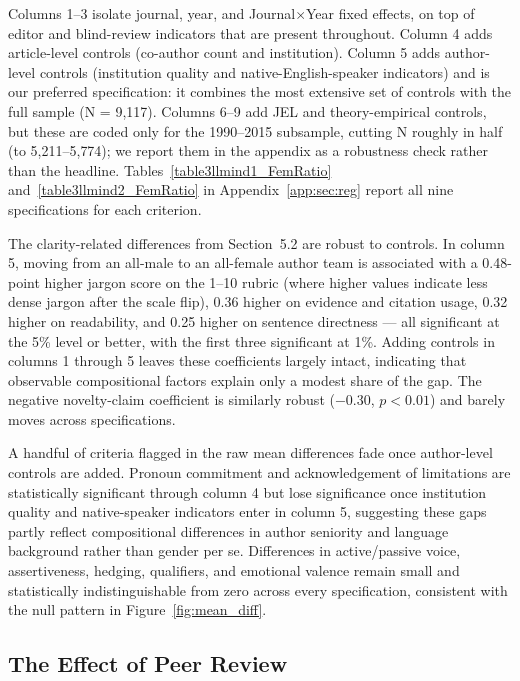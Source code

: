 Columns 1--3 isolate journal, year, and Journal\(\times\)Year fixed effects, on top of editor and blind-review indicators that are present throughout. Column 4 adds article-level controls (co-author count and institution). Column 5 adds author-level controls (institution quality and native-English-speaker indicators) and is our preferred specification: it combines the most extensive set of controls with the full sample (N = 9{,}117). Columns 6--9 add JEL and theory-empirical controls, but these are coded only for the 1990--2015 subsample, cutting N roughly in half (to 5{,}211--5{,}774); we report them in the appendix as a robustness check rather than the headline. Tables~\ref{table3llmind1_FemRatio} and~\ref{table3llmind2_FemRatio} in Appendix~\ref{app:sec:reg} report all nine specifications for each criterion.

The clarity-related differences from Section~5.2 are robust to controls. In column 5, moving from an all-male to an all-female author team is associated with a 0.48-point higher jargon score on the 1--10 rubric (where higher values indicate less dense jargon after the scale flip), 0.36 higher on evidence and citation usage, 0.32 higher on readability, and 0.25 higher on sentence directness --- all significant at the 5\% level or better, with the first three significant at 1\%. Adding controls in columns 1 through 5 leaves these coefficients largely intact, indicating that observable compositional factors explain only a modest share of the gap. The negative novelty-claim coefficient is similarly robust ($-0.30$, $p<0.01$) and barely moves across specifications.

A handful of criteria flagged in the raw mean differences fade once author-level controls are added. Pronoun commitment and acknowledgement of limitations are statistically significant through column 4 but lose significance once institution quality and native-speaker indicators enter in column 5, suggesting these gaps partly reflect compositional differences in author seniority and language background rather than gender per se. Differences in active/passive voice, assertiveness, hedging, qualifiers, and emotional valence remain small and statistically indistinguishable from zero across every specification, consistent with the null pattern in Figure~\ref{fig:mean_diff}.

\subsection{The Effect of Peer Review}\label{sec:Peer_Review_Results}

